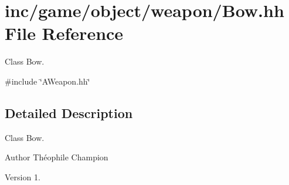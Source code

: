 \hypertarget{Bow_8hh}{}\section{inc/game/object/weapon/\+Bow.hh File Reference}
\label{Bow_8hh}


Class Bow.  


{\ttfamily \#include \char`\"{}A\+Weapon.\+hh\char`\"{}}\newline


\subsection{Detailed Description}
Class Bow. 

\begin{DoxyAuthor}{Author}
Théophile Champion 
\end{DoxyAuthor}
\begin{DoxyVersion}{Version}
1. 
\end{DoxyVersion}
